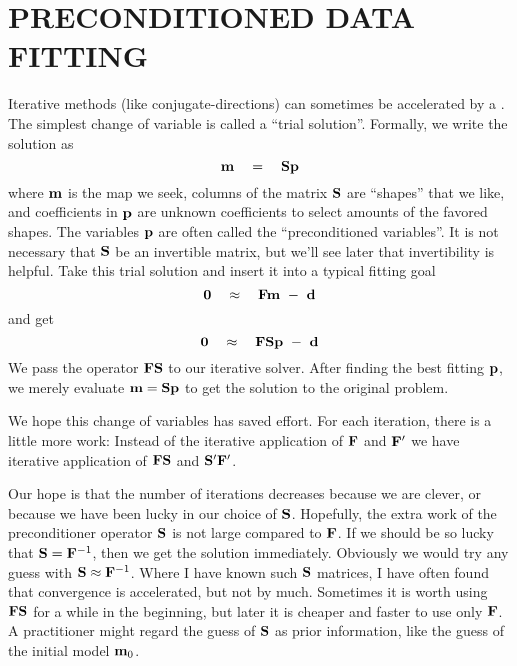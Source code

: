 \section{PRECONDITIONED DATA FITTING}
\par
Iterative methods (like conjugate-directions) can sometimes be accelerated
by a .
The simplest change of variable is called a ``trial solution''.
Formally, we write the solution as
\begin{equation}
\bold m \quad =\quad \bold S \bold p
\end{equation}
where $\bold m$ is the map we seek,
columns of the matrix $\bold S$ are ``shapes'' that we like,
and coefficients in $\bold p$ are unknown coefficients
to select amounts of the favored shapes.
The variables $\bold p$  are often called the ``preconditioned variables''.
It is not necessary that $\bold S$ be an invertible matrix,
but we'll see later that invertibility is helpful.
Take this trial solution and insert it into
a typical fitting goal
\begin{equation}
\bold 0 \quad\approx\quad  \bold F \bold m \ -\  \bold d
\end{equation}
and get
\begin{equation}
\bold 0 \quad\approx\quad  \bold F \bold S \bold p \ -\  \bold d
\end{equation}
We pass the operator $\bold F \bold S$ to our iterative solver.
After finding the best fitting                                      $\bold p$,
we merely evaluate
                                                $ \bold m = \bold S \bold p$
to get the solution to the original problem.

\par
We hope this change of variables has saved effort.
For each iteration, there is a little more work:
Instead of the iterative application of
                                                $\bold F$ and $\bold F'$
we have iterative application of
                                        $\bold F\bold S$ and $\bold S'\bold F'$.

Our hope is that the number of iterations decreases because we are clever,
or because we have been lucky in our choice of $\bold S$.
Hopefully,
the extra work of the preconditioner operator $\bold S$
is not large compared to $\bold F$.
If we should be so lucky that
$\bold S= \bold F^{-1}$,
then we get the solution immediately.
Obviously we would try any guess with
$\bold S\approx \bold F^{-1}$.
Where I have known such $\bold S$ matrices,
I have often found that convergence is accelerated,
but not by much.
Sometimes it is worth using $\bold F\bold S$ for a while in the beginning,
but later it is cheaper and faster to use only $\bold F$.
A practitioner might regard the guess of $\bold S$
as prior information,
like the guess of the initial model $\bold m_0$.

